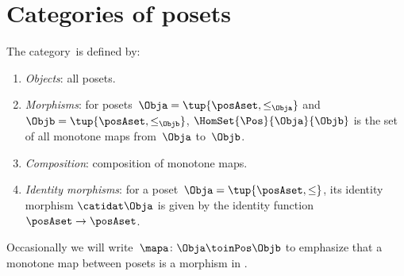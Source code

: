 
\section[Categories of posets]{Categories of posets}
\label{sec:category-Pos}

\begin{ctdefinition}
    \label{def:Pos}
    The category~\Pos is defined by:
    \begin{enumerate}
        \item \emph{Objects}: all posets.
        \item \emph{Morphisms}: for posets~$\Obja = \tup{\posAset, \leq_\Obja}$ and $\Objb = \tup{\posAset, \leq_\Objb}$,  $\HomSet{\Pos}{\Obja}{\Objb}$ is the set of all monotone maps from~$\Obja$ to~$\Objb$.
        \item \emph{Composition}: composition of monotone maps.
        \item \emph{Identity morphisms}: for a poset~$\Obja = \tup{\posAset, \leq}$, its identity morphism $\catidat\Obja$ is given by the identity function $\posAset \to \posAset$.
    \end{enumerate}
\end{ctdefinition}

Occasionally we will write~$\mapa \colon \Obja \toinPos \Objb$ to emphasize that a monotone map between posets is a morphism in \Pos.

